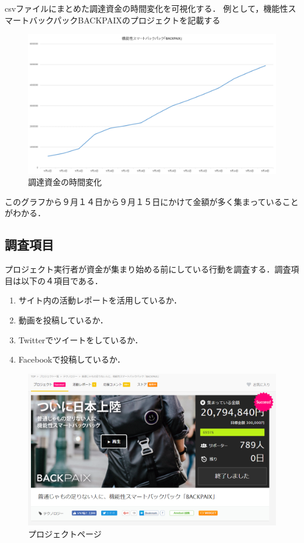 csvファイルにまとめた調達資金の時間変化を可視化する．
例として，機能性スマートバックパックBACKPAIXのプロジェクトを記載する

\begin{figure}[H]
\centering
\includegraphics[width=16cm]{chousa1.PNG}
\caption{調達資金の時間変化}\label{サンプル図}
\end{figure}

このグラフから９月１４日から９月１５日にかけて金額が多く集まっていることがわかる．

\newpage
\subsection{調査項目}

プロジェクト実行者が資金が集まり始める前にしている行動を調査する．調査項目は以下の４項目である．

\begin{enumerate}
 \item サイト内の活動レポートを活用しているか．
 \item 動画を投稿しているか．
 \item Twitterでツイートをしているか．
 \item Facebookで投稿しているか．
\end{enumerate}


\begin{figure}[H]
\centering
\includegraphics[width=16cm]{chousa2.PNG}
\caption{プロジェクトページ}\label{サンプル図}
\end{figure}

